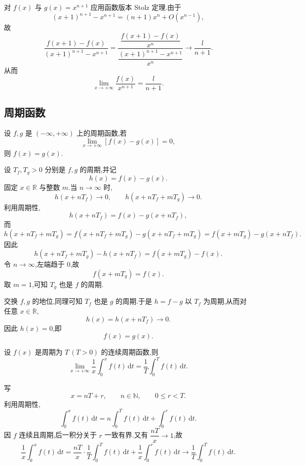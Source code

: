 \begin{solution}
    对 $f(x)$ 与 $g(x)=x^{n+1}$ 应用函数版本 Stolz 定理.由于
    \[
        (x+1)^{n+1}-x^{n+1}
        =(n+1)x^n+O(x^{n-1}),
    \]
    故
    \[
        \dfrac{f(x+1)-f(x)}{(x+1)^{n+1}-x^{n+1}}
        =\dfrac{\dfrac{f(x+1)-f(x)}{x^n}}
        {\dfrac{(x+1)^{n+1}-x^{n+1}}{x^n}}
        \longrightarrow\dfrac{l}{n+1}.
    \]
    从而
    \[
        \displaystyle\lim\limits_{x\to+\infty}\dfrac{f(x)}{x^{n+1}}
        =\dfrac{l}{n+1}.
    \]
\end{solution}



\subsection{周期函数}

\begin{example}
    设 $f,g$ 是 $(-\infty,+\infty)$ 上的周期函数,若
    \[
        \displaystyle\lim\limits_{x\to+\infty}[f(x)-g(x)]=0,
    \]
    则 $f(x)=g(x)$.
\end{example}
\exampleblank

\begin{solution}
    设 $T_f,T_g>0$ 分别是 $f,g$ 的周期,并记
    \[
        h(x)=f(x)-g(x).
    \]
    固定 $x\in\mathbb{R}$ 与整数 $m$.当 $n\to\infty$ 时,
    \[
        h(x+nT_f)\longrightarrow0,
        \qquad
        h(x+nT_f+mT_g)\longrightarrow0.
    \]
    利用周期性,
    \[
        h(x+nT_f)
        =f(x)-g(x+nT_f),
    \]
    而
    \[
        h(x+nT_f+mT_g) = f(x+nT_f+mT_g)-g(x+nT_f+mT_g) = f(x+mT_g)-g(x+nT_f).
    \]
    因此
    \[
        h(x+nT_f+mT_g)-h(x+nT_f)
        =f(x+mT_g)-f(x).
    \]
    令 $n\to\infty$,左端趋于 $0$,故
    \[
        f(x+mT_g)=f(x).
    \]
    取 $m=1$,可知 $T_g$ 也是 $f$ 的周期.

    交换 $f,g$ 的地位,同理可知 $T_f$ 也是 $g$ 的周期.于是 $h=f-g$ 以 $T_f$ 为周期,从而对任意 $x\in\mathbb{R}$,
    \[
        h(x)=h(x+nT_f)\longrightarrow0.
    \]
    因此 $h(x)=0$,即
    \[
        f(x)=g(x).
    \]
\end{solution}

\begin{example}
    设 $f(x)$ 是周期为 $T\,(T>0)$ 的连续周期函数,则
    \[
        \displaystyle\lim\limits_{x\to+\infty}
        \dfrac{1}{x}\int_0^x f(t)\,\mathrm{d}t
        =\dfrac{1}{T}\int_0^T f(t)\,\mathrm{d}t.
    \]
\end{example}
\exampleblank

\begin{solution}
    写
    \[
        x=nT+r,
        \qquad
        n\in\mathbb{N},
        \qquad
        0\leq r<T.
    \]
    利用周期性,
    \[
        \displaystyle\int_0^x f(t)\,\mathrm{d}t
        =n\int_0^T f(t)\,\mathrm{d}t+\int_0^r f(t)\,\mathrm{d}t.
    \]
    因 $f$ 连续且周期,后一积分关于 $r$ 一致有界.又有 $\dfrac{nT}{x}\to1$,故
    \[
        \dfrac{1}{x}\int_0^x f(t)\,\mathrm{d}t
        =\dfrac{nT}{x}\cdot\dfrac{1}{T}\int_0^T f(t)\,\mathrm{d}t
        +\dfrac{1}{x}\int_0^r f(t)\,\mathrm{d}t
        \longrightarrow\dfrac{1}{T}\int_0^T f(t)\,\mathrm{d}t.
    \]
\end{solution}


